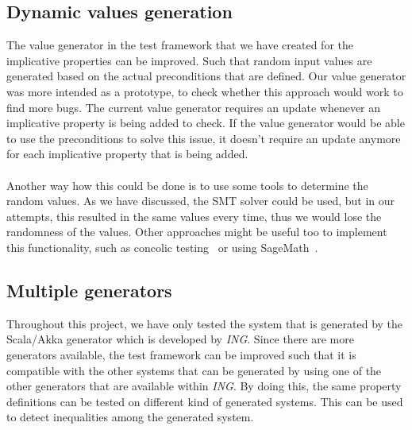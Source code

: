\subsection*{Dynamic values generation}
The value generator in the test framework that we have created for the implicative properties can be improved. Such that random input values are generated based on the actual preconditions that are defined. Our value generator was more intended as a prototype, to check whether this approach would work to find more bugs. The current value generator requires an update whenever an implicative property is being added to check. If the value generator would be able to use the preconditions to solve this issue, it doesn't require an update anymore for each implicative property that is being added.\\
\\
Another way how this could be done is to use some tools to determine the random values. As we have discussed, the SMT solver could be used, but in our attempts, this resulted in the same values every time, thus we would lose the randomness of the values. Other approaches might be useful too to implement this functionality, such as concolic testing~\cite{sen2006cute} or using SageMath~\cite{siteSageMath2017}. %

\subsection*{Multiple generators}
Throughout this project, we have only tested the system that is generated by
the Scala/Akka generator which is developed by \textit{ING}. Since there are
more generators available, the test framework can be improved such that it is
compatible with the other systems that can be generated by using one of the
other generators that are available within \textit{ING}. By doing this, the same
property definitions can be tested on different kind of generated systems. This
can be used to detect inequalities among the generated system.


